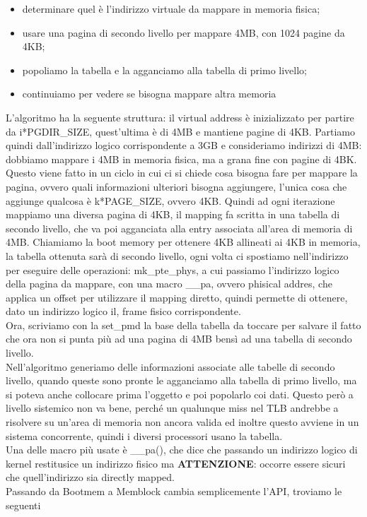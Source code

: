 \documentclass[12pt, oneside]{extbook}
\begin{document}
\begin{itemize}
\item determinare quel è l'indirizzo virtuale da mappare in memoria fisica;
\item usare una pagina di secondo livello per mappare 4MB, con 1024 pagine da 4KB;
\item popoliamo la tabella e la agganciamo alla tabella di primo livello;
\item continuiamo per vedere se bisogna mappare altra memoria
\end{itemize}
L'algoritmo ha la seguente struttura:
il virtual address è inizializzato per partire da i*\textsf{PGDIR\_SIZE}, quest'ultima è di 4MB e mantiene pagine di 4KB. Partiamo quindi dall'indirizzo logico corrispondente a 3GB e consideriamo indirizzi di 4MB: dobbiamo mappare i 4MB in memoria fisica, ma a grana fine con pagine di 4BK. Questo viene fatto in un ciclo in cui ci si chiede cosa bisogna fare per mappare la pagina, ovvero quali informazioni ulteriori bisogna aggiungere, l'unica cosa che aggiunge qualcosa è k*\textsf{PAGE\_SIZE}, ovvero 4KB. Quindi ad ogni iterazione mappiamo una diversa pagina di 4KB, il mapping fa scritta in una tabella di secondo livello, che va poi agganciata alla entry associata all'area di memoria di 4MB. Chiamiamo la boot memory per ottenere 4KB allineati ai 4KB in memoria, la tabella ottenuta sarà di secondo livello, ogni volta ci spostiamo nell'indirizzo per eseguire delle operazioni: \textsf{mk\_pte\_phys}, a cui passiamo l'indirizzo logico della pagina da mappare, con una macro \_\_pa, ovvero phisical addres, che applica un offset per utilizzare il mapping diretto, quindi permette di ottenere, dato un indirizzo logico il, frame fisico corrispondente.\\ Ora, scriviamo con la \textsf{set\_pmd} la base della tabella da toccare per salvare il fatto che ora non si punta più ad una pagina di 4MB bensì ad una tabella di secondo livello.\\ Nell'algoritmo generiamo delle informazioni associate alle tabelle di secondo livello, quando queste sono pronte le agganciamo alla tabella di primo livello, ma si poteva anche collocare prima l'oggetto e poi popolarlo coi dati. Questo però a livello sistemico non va bene, perché un qualunque miss nel TLB andrebbe a risolvere su un'area di memoria non ancora valida ed inoltre questo avviene in un sistema concorrente, quindi i diversi processori usano la tabella.\\ Una delle macro più usate è \textsf{\_\_pa()}, che dice che passando un indirizzo logico di kernel restitusice un indirizzo fisico ma \textbf{ATTENZIONE}: occorre essere sicuri che quell'indirizzo sia directly mapped.\\ Passando da Bootmem a Memblock cambia semplicemente l'API, troviamo le seguenti
\end{document}
